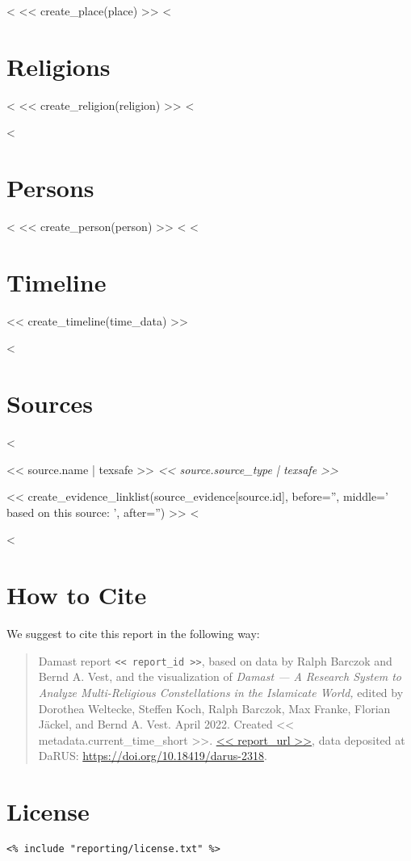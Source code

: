 \documentclass[fontsize=10pt,toc=chapterentrywithdots]{scrreprt}
\begin{document}
<%
<< create_place(place) >>
<%


\clearpage
\chapter{Religions}
\label{sec:religions}

<%
  << create_religion(religion) >>
<%


<%
\clearpage
\chapter{Persons}
\label{sec:persons}

<%
  << create_person(person) >>
<%
<%


\clearpage
\chapter{Timeline}
\label{sec:timeline}

<< create_timeline(time_data) >>


<%
\clearpage
\chapter{Sources}
\label{sec:sources}

\begin{description}
    <%
  \item[\textsc{<< source.short | texsafe >>}]
      \hypertarget{source<<source.id>>}{<< source.name | texsafe >>
        \emph{<< source.source_type | texsafe >>}}

      << create_evidence_linklist(source_evidence[source.id], before='', middle=' based on this source: ', after='') >>
    <%
\end{description}
<%

\clearpage
\chapter*{How to Cite}
\label{sec:how-to-cite}

We suggest to cite this report in the following way:

\begingroup
\small
\begin{quote}
  Damast report \texttt{<< report_id >>},
  based on data by Ralph Barczok and Bernd A. Vest, and the visualization of
  \emph{Damast --- A Research System to Analyze Multi-Religious Constellations in the Islamicate World,}
  edited by Dorothea Weltecke, Steffen Koch, Ralph Barczok, Max Franke, Florian Jäckel, and Bernd A. Vest.
  April 2022.
  Created << metadata.current_time_short >>.
  \url{<< report_url >>}, data deposited at DaRUS:
  \url{https://doi.org/10.18419/darus-2318}.
\end{quote}
\endgroup


\clearpage
\chapter*{License}
\label{sec:license}

\begingroup
\small
\begin{verbatim}
<% include "reporting/license.txt" %>
\end{verbatim}
\endgroup
\end{document}

